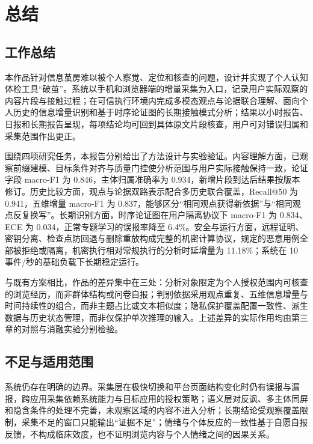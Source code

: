 \FloatBarrier\clearpage

\section{总结}\label{chapter:5}

\subsection{工作总结}\label{section:5.1}

本作品针对信息茧房难以被个人察觉、定位和核查的问题，设计并实现了个人认知体检工具``破茧''。系统以手机和浏览器端的增量采集为入口，记录用户实际观察的内容片段与接触过程；在可信执行环境内完成多模态观点与论据联合理解、面向个人历史的信息增量识别和基于时序论证图的长期接触模式分析；结果以小时报告、日报和长期报告呈现，每项结论均可回到具体原文片段核查，用户可对错误归属和采集范围作出更正。

围绕四项研究任务，本报告分别给出了方法设计与实验验证。内容理解方面，已观察前缀建模、目标条件对齐与质量门控使分析范围与用户实际接触保持一致，论证字段 macro-F1 为 0.846，主体归属准确率为 0.934，新增片段到达后结果按版本修订。历史比较方面，观点与论据双路表示配合多历史联合覆盖，Recall@50 为 0.941，五维增量 macro-F1 为 0.837，能够区分``相同观点获得新依据''与``相同观点反复换写''。长期识别方面，时序论证图在用户隔离协议下 macro-F1 为 0.834、ECE 为 0.034，正常专题学习的误报率降至 6.4\%。安全与运行方面，远程证明、密钥分离、检查点防回退与删除重放构成完整的机密计算协议，规定的恶意用例全部被拒绝或隔离，机密执行相对常规执行的分析时延增量为 11.18\%；系统在 10 事件/秒的基础负载下长期稳定运行。

与既有方案相比，作品的差异集中在三处：分析对象限定为个人授权范围内可核查的浏览经历，而非群体结构或问卷自报；判别依据采用观点重复、五维信息增量与时间持续性的组合，而非主题占比或文本相似度；隐私保护覆盖配置一致性、派生数据与历史状态管理，而非仅保护单次推理的输入。上述差异的实际作用均由第三章的对照与消融实验分别检验。

\subsection{不足与适用范围}\label{section:5.2}

系统仍存在明确的边界。采集层在极快切换和平台页面结构变化时仍有误报与漏报，跨应用采集依赖系统能力与目标应用的授权策略；语义层对反讽、多主体同屏和隐含条件的处理不完善，未观察区域的内容不进入分析；长期结论受观察覆盖限制，采集不足的窗口只能输出``证据不足''；情绪与个体反应的一致性基于自愿自报反馈，不构成临床效度，也不证明浏览内容与个人情绪之间的因果关系。

